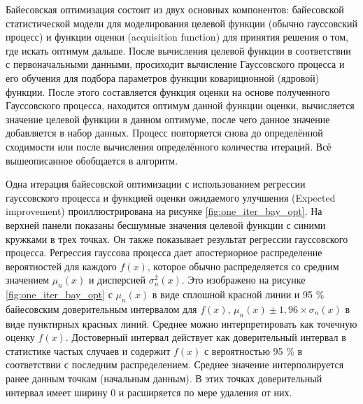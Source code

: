 Байесовская оптимизация состоит из двух основных компонентов: байесовской статистической модели для моделирования целевой функции (обычно гауссовский процесс) и функции оценки (acquisition function) для принятия решения о том, где искать оптимум дальше. После вычисления целевой функции в соответствии с первоначальными данными, просиходит вычисление Гауссовского процесса и его обучения для подбора параметров функции ковариционной (ядровой) функции. После этого составляется функция оценки на основе полученного Гауссовского процесса, находится оптимум данной функции оценки, вычисляется значение целевой функции в данном оптимуме, после чего данное значение добавляется в набор данных. Процесс повторяется снова до определённой сходимости или после вычисления определённого количества итераций. Всё вышеописанное обобщается в алгоритм.


Одна итерация байесовской оптимизации с использованием регрессии гауссовского процесса и функцией оценки ожидаемого улучшения (Expected \\ improvement) проиллюстрирована на рисунке \ref{fig:one_iter_bay_opt}. На верхней панели показаны бесшумные значения целевой функции с синими кружками в трех точках. Он также показывает результат регрессии гауссовского процесса. Регрессия гауссова процесса дает апостериорное распределение вероятностей для каждого $f(x)$, которое обычно распределяется со средним значением $\mu_n(x)$ и дисперсией $\sigma^2_n(x)$. Это изображено на рисунке \ref{fig:one_iter_bay_opt} с $\mu_n(x)$ в виде сплошной красной линии и 95 \% байесовским доверительным интервалом для $f(x)$, $\mu_n(x) \pm 1,96 \times \sigma_n(x)$ в виде пунктирных красных линий. Среднее можно интерпретировать как точечную оценку $f(x)$. Достоверный интервал действует как доверительный интервал в статистике частых случаев и содержит $f(x)$ с вероятностью 95 \% в соответствии с последним распределением. Среднее значение интерполируется ранее данным точкам (начальным данным). В этих точках доверительный интервал имеет ширину 0 и расширяется по мере удаления от них.\cite{bayess}

